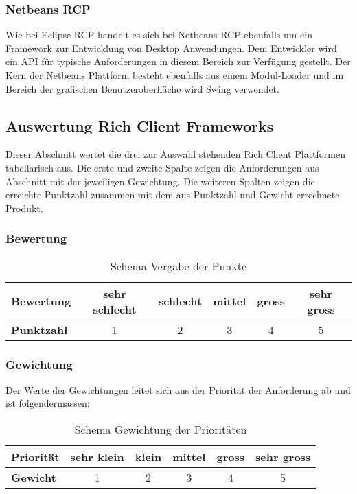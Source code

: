 \subsubsection{Netbeans RCP}
Wie bei Eclipse RCP handelt es sich bei Netbeans RCP ebenfalls um ein Framework zur Entwicklung von Desktop Anwendungen. Dem Entwickler wird ein API für typische Anforderungen in diesem Bereich zur Verfügung gestellt. Der Kern der Netbeans Plattform besteht ebenfalls aus einem Modul-Loader und im Bereich der grafischen Benutzeroberfläche wird Swing verwendet.

\subsection{Auswertung Rich Client Frameworks}
Dieser Abschnitt wertet die drei zur Auswahl stehenden Rich Client Plattformen tabellarisch aus. Die erste und zweite Spalte zeigen die Anforderungen aus Abschnitt  mit der jeweiligen Gewichtung. Die weiteren Spalten zeigen die erreichte Punktzahl zusammen mit dem aus Punktzahl und Gewicht errechnete Produkt.

\subsubsection{Bewertung}
\begin{longtable}{|l|c|c|c|c|c|}
    \caption{Schema Vergabe der Punkte}\\\hline
 \textbf{Bewertung} & sehr schlecht & schlecht & mittel & gross & sehr gross\\\hline
 \textbf{Punktzahl} & 1 & 2 & 3 & 4 & 5\\\hline
\end{longtable}

\subsubsection{Gewichtung}
Der Werte der Gewichtungen leitet sich aus der Priorität der Anforderung ab und ist folgendermassen: 

\begin{longtable}{|l|c|c|c|c|c|}
    \caption{Schema Gewichtung der Prioritäten}\\\hline
 \textbf{Priorität} & sehr klein & klein & mittel & gross & sehr gross\\\hline
 \textbf{Gewicht} & 1 & 2 & 3 & 4 & 5\\\hline
\end{longtable}

